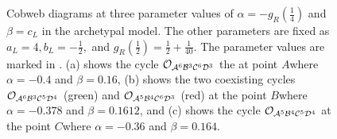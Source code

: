 \begin{figure}
	\centering
	\caption[Cobwebs of the archetypal model]{
		Cobweb diagrams at three parameter values of $\alpha = -g_R\left(\frac{1}{4}\right)$ and $\beta = c_L$ in the archetypal model.
		The other parameters are fixed as $a_L = 4, b_L = -\frac{1}{2},$ and $g_R\left(\frac{1}{2}\right) = \frac{1}{2} + \frac{1}{40}$.
		The parameter values are marked in .
		(a) shows the cycle $\mathcal{O}_{\mathcal{A}^6\mathcal{B}^3\mathcal{C}^6\mathcal{D}^3}$ the at point $A$where $\alpha = -0.4$ and $\beta = 0.16$,
		(b) shows the two coexisting cycles $\mathcal{O}_{\mathcal{A}^6\mathcal{B}^3\mathcal{C}^5\mathcal{D}^4}$ (green) and $\mathcal{O}_{\mathcal{A}^5\mathcal{B}^4\mathcal{C}^6\mathcal{D}^3}$ (red) at the point $B$where $\alpha = -0.378$ and $\beta = 0.1612$,
		and (c) shows the cycle $\mathcal{O}_{\mathcal{A}^5\mathcal{B}^4\mathcal{C}^5\mathcal{D}^4}$ at the point $C$where $\alpha = -0.36$ and $\beta = 0.164$.
	}
	\label{fig:setup.arch.cobwebs}
\end{figure}
